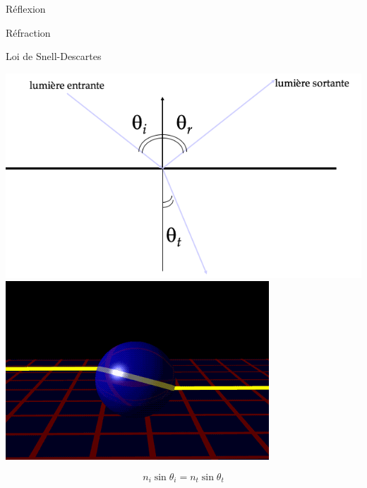 \begin{frame}{Réflexion}
    \begin{center}
    \end{center}
\end{frame}

\begin{frame}{Réfraction}
    \begin{center}
    \end{center}
\end{frame}

\begin{frame}{Loi de Snell-Descartes}
    \begin{center}
        \includegraphics[width=.5\textwidth]{figs/descartes.png}
        \includegraphics[width=.4\textwidth]{figs/descartes-2.png}
    \end{center}
    $$
        n_i \sin \theta_i = n_t \sin \theta_t
    $$
\end{frame}

